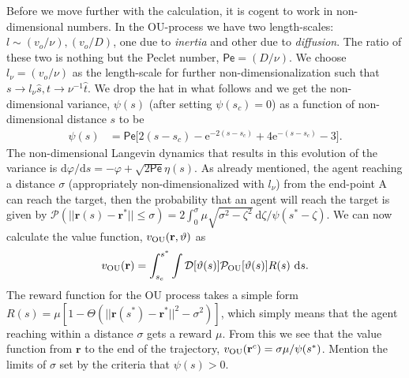 \documentclass[%
reprint,
superscriptaddress,
floatfix,
amsmath,
amssymb,
aps,
notitlepage
]{revtex4-1}
\def\d{\text{d}}
\def\e{\text{e}}
\def\r{\mathbf{r}}
\def\P{\mathcal{P}}
\def\D{\mathcal{D}}
\def\theta{\vartheta}
\def\Pe{\mathsf{Pe}}
\begin{document}
Before we move further with the calculation, it is cogent to work in non-dimensional numbers. In the OU-process
we have two length-scales: $l \sim (v_o/\nu), (v_o/D)$, one due to \textit{inertia} and other due to \textit{diffusion}.
The ratio of these two is nothing but the Peclet number, $\Pe = (D/\nu)$. We choose $l_\nu = (v_o/\nu)$ as the length-scale
for further non-dimensionalization such that $s \rightarrow l_\nu \hat{s}, t \rightarrow \nu^{-1} \hat{t}$. We drop the hat in what follows and we get
the non-dimensional variance, $\psi(s)$ (after setting $\psi(s_c) =0$) as a function of non-dimensional distance $s$ to be
\begin{align}
    \psi(s)& = \Pe \bigg[ 2 (s-s_c) - \e^{-2 (s-s_c)} + 4 \e^{-(s-s_c)} - 3 \bigg].
\end{align}
The non-dimensional Langevin dynamics that results in this evolution of the variance is $\d \varphi/\d s = - \varphi + \sqrt{2 \Pe} \eta(s)$.
As already mentioned, the agent reaching a distance $\sigma$ (appropriately non-dimensionalized with $l_\nu$) from the end-point A
can reach the target, then the probability that an agent will reach the target is given by $\P(||\r(s) - \r^*|| \leq \sigma)
= 2\int_0^\sigma \mu \sqrt{\sigma^2-\zeta^2} \ \d \zeta/\psi(s^*-\zeta)$. We can now calculate the value function, $v_{\rm OU}(\r, \theta)$ as
\[
    v_{\rm OU}(\r) = \int_{s_c}^{s^*} \int \D[\theta(s)] \P_{\rm OU}[\theta(s)] R(s) \ \d s.
\]
The reward function for the OU process takes a simple form $R(s) = \mu[1 - \Theta(||\r(s^*) - \r^*||^2 - \sigma^2)]$,
which simply means that the agent reaching within a distance $\sigma$ gets a reward $\mu$.
From this we see that the value function from $\r$ to the end of the trajectory, $v_{\rm OU}(\r^c) = \sigma \mu/\psi(s^*)$.
Mention the limits of $\sigma$ set by the criteria that $\psi(s) > 0$.
\end{document}
